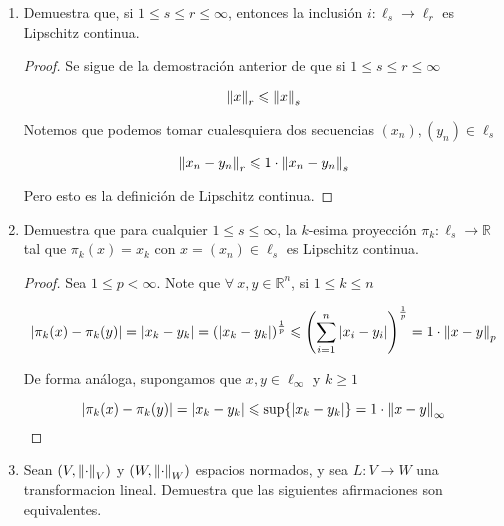 \documentclass[12pt]{article}
\newcommand\R{\ensuremath{\mathbb{R}}}
\begin{document}
\begin{enumerate}[label=\textbf{\arabic*}.]
\begin{proof}
\begin{enumerate}
        $$\begin{aligned} 
|(fg)(x) - (fg)(y)| &\leqslant |f(x)g(x) - f(x)g(y)| + |f(x)g(y) - f(y)g(y)| \\&\leqslant M(|g(x) - g(y)|+|f(x)-f(y)|)
\end{aligned}$$

\item Sea $f(x)=cos(x)$ y $g(x) = x$. Note que $$h(x):=f(x)g(x)=xcos(x)$$ 

no es Lipschitz en $\R$
\end{enumerate}
\end{proof}

\item Demuestra que, si $1 \leqslant s \leqslant r \leqslant \infty$, entonces la inclusión $i : \ell_s \to \ell_r$ es Lipschitz continua.

\begin{proof}
    Se sigue de la demostración anterior de que si $1 \leqslant s \leqslant r \leqslant \infty$

    $$ {\norm{x}}_{r} \leqslant {\norm{x}}_{s}$$

    Notemos que podemos tomar cualesquiera dos secuencias $(x_n), (y_n) \in \ell_s$ 

    $${\norm{x_n-y_n}}_{r} \leqslant 1 \cdot {\norm{x_n-y_n}}_{s} $$

    Pero esto es la definición de Lipschitz continua. 
\end{proof}

\item Demuestra que para cualquier $1 \leqslant s \leqslant \infty$, la $k$-esima proyección $\pi_k : \ell_s \to \R$ tal que $\pi_k(x) = x_k$ con $x = (x_n) \in \ell_s$ es Lipschitz
continua.

\begin{proof}
    Sea $1 \leqslant p < \infty$. Note que $\forall \: x, y \in \R^n$, si $ 1 \leqslant k \leqslant n$

    $$ \abs{\pi_k(x)-\pi_k(y)} = \abs{x_k-y_k} = {\left( \abs{x_k-y_k} \right)}^{\frac{1}{p}} \leqslant  {\left( \sum_{i=1}^{n} \abs{x_i-y_i} \right)}^{\frac{1}{p}} = 1 \cdot {\norm{x-y}}_{p}$$ 

    De forma análoga, supongamos que $x,y \in \ell_\infty$ y $k \geqslant 1$

    $$ \abs{\pi_k(x)-\pi_k(y)} = \abs{x_k-y_k} \leqslant \sup \{ \abs{x_k-y_k} \}   = 1 \cdot {\norm{x-y}}_{\infty}$$
\end{proof}

\item Sean $(V, \norm{\cdot}_V )$ y $(W, \norm{\cdot}_W )$ espacios normados, y sea $L : V \to W$ una transformacion lineal. Demuestra que las siguientes afirmaciones son equivalentes.


\end{enumerate}
\end{document}
